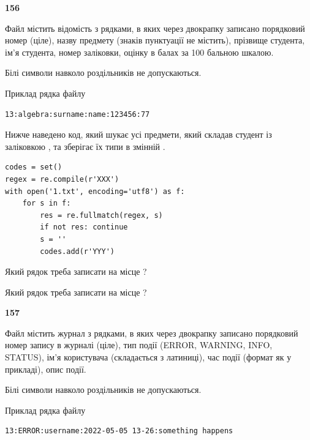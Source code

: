 \newpage

{\begin {center}\textbf{ 156}\end {center}}\par
Файл  містить відомість з рядками, в яких через двокрапку записано поряд\-ковий номер (ціле), назву предмету (знаків пунктуації не містить), прізвище студента, ім'я студента, номер заліковки, оцінку в балах за 100 бальною шкалою.

Білі символи навколо роздільників не допускаються.

Приклад рядка файлу



\begin{verbatim}
13:algebra:surname:name:123456:77
\end{verbatim}


Нижче наведено код, який шукає усі предмети, який складав студент із заліковкою , та зберігає їх типи в змінній .



\begin{verbatim}
codes = set()
regex = re.compile(r'XXX')
with open('1.txt', encoding='utf8') as f:
    for s in f:
        res = re.fullmatch(regex, s)
        if not res: continue
        s = ''
        codes.add(r'YYY')
\end{verbatim}





Який рядок треба записати на місце  ?\par
\vspace{5mm}


Який рядок треба записати на місце  ?\par


\newpage

{\begin {center}\textbf{ 157}\end {center}}\par
Файл  містить журнал з рядками, в яких через двокрапку записано поряд\-ко\-вий номер запису в журналі (ціле), тип події (ERROR, WARNING, INFO, STATUS), ім'я користувача (складається з латиниці), час події (фор\-мат як у прикладі), опис події.

Білі символи навколо роздільників не допускаються.

Приклад рядка файлу



\begin{verbatim}
13:ERROR:username:2022-05-05 13-26:something happens
\end{verbatim}


